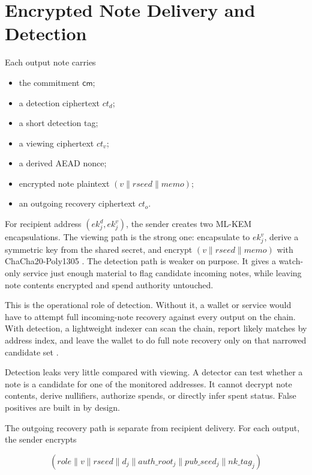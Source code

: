 \documentclass[11pt]{article}
\newcommand{\cm}{\mathsf{cm}}
\begin{document}
\section{Encrypted Note Delivery and Detection}

Each output note carries

\begin{itemize}
  \item the commitment \(\cm\);
  \item a detection ciphertext \(ct_d\);
  \item a short detection tag;
  \item a viewing ciphertext \(ct_v\);
  \item a derived AEAD nonce;
  \item encrypted note plaintext \((v \parallel rseed \parallel memo)\);
  \item an outgoing recovery ciphertext \(ct_o\).
\end{itemize}

For recipient address \((ek^d_j, ek^v_j)\), the sender creates two ML-KEM
encapsulations. The viewing path is the strong one: encapsulate to \(ek^v_j\),
derive a symmetric key from the shared secret, and encrypt
\((v \parallel rseed \parallel memo)\) with ChaCha20-Poly1305
\cite{nist-fips203,kyber,chacha-rfc}. The detection path is weaker on purpose.
It gives a watch-only service just enough material to flag candidate incoming
notes, while leaving note contents encrypted and spend authority untouched.

This is the operational role of detection. Without it, a wallet or service would
have to attempt full incoming-note recovery against every output on the chain.
With detection, a lightweight indexer can scan the chain, report likely
matches by address index, and leave the wallet to do full note recovery only on
that narrowed candidate set \cite{fmd}.

Detection leaks very little compared with viewing. A detector can test whether a
note is a candidate for one of the monitored addresses. It cannot decrypt note
contents, derive nullifiers, authorize spends, or directly infer spent status.
False positives are built in by design.

The outgoing recovery path is separate from recipient delivery. For each output,
the sender encrypts

\[
(role \parallel v \parallel rseed \parallel d_j \parallel auth\_root_j
 \parallel pub\_seed_j \parallel nk\_tag_j)
\]
\end{document}
